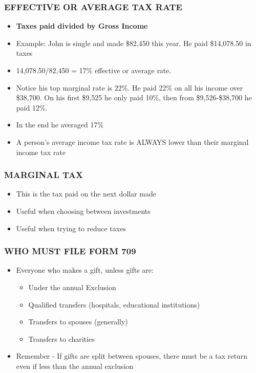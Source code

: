 \documentclass[12pt]{article}
\begin{document}
            \subsubsection{EFFECTIVE OR AVERAGE TAX RATE}
                \begin{itemize}
                    \item \textbf{Taxes paid divided by Gross Income}
                    \item Example: John is single and made \$82,450 this year. He paid \$14,078.50 in taxes
                    \item 14,078.50/82,450 = 17\% effective or average rate.
                    \item Notice his top marginal rate is 22\%. He paid 22\% on all his income over \$38,700. On his first \$9,525
                        he only paid 10\%, then from \$9,526-\$38,700 he paid 12\%.
                    \item In the end he averaged 17\%
                    \item A person's average income tax rate is ALWAYS lower than their marginal income tax rate
                \end{itemize}
            \subsubsection{MARGINAL TAX}
                \begin{itemize}
                    \item This is the tax paid on the next dollar made
                    \item Useful when choosing between investments
                    \item Useful when trying to reduce taxes
                \end{itemize}
            \subsubsection{WHO MUST FILE FORM 709}
                \begin{itemize}
                    \item Everyone who makes a gift, unless gifts are:
                        \begin{itemize}
                            \item Under the annual Exclusion
                            \item Qualified transfers (hospitals, educational institutions)
                            \item Transfers to spouses (generally)
                            \item Transfers to charities
                        \end{itemize}
                    \item Remember - If gifts are split between spouses, there must be a tax return even if less than the annual exclusion
                \end{itemize}
\end{document}
